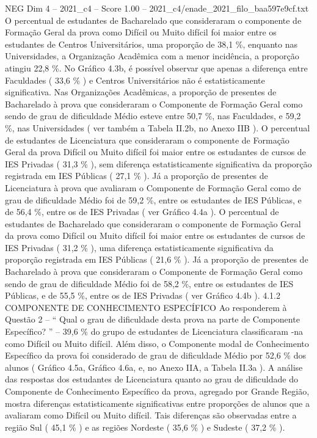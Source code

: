 \begin{textsample}{NEG Dim 4 – 2021\_c4 – Score 1.00 – 2021\_c4/enade\_2021\_filo\_baa597e9cf.txt}
O percentual de estudantes de Bacharelado que consideraram o componente de Formação Geral da prova como Difícil ou Muito difícil foi maior entre os estudantes de Centros Universitários, uma proporção de 38,1 \%, enquanto nas Universidades, a Organização Acadêmica com a menor incidência, a proporção atingiu 22,8 \%.
No Gráfico 4.3b, é possível observar que apenas a diferença entre Faculdades ( 33,6 \% ) e Centros Universitários não é estatisticamente significativa.
Nas Organizações Acadêmicas, a proporção de presentes de Bacharelado à prova que consideraram o Componente de Formação Geral como sendo de grau de dificuldade Médio esteve entre 50,7 \%, nas Faculdades, e 59,2 \%, nas Universidades ( ver também a Tabela II.2b, no Anexo IIB ).
O percentual de estudantes de Licenciatura que consideraram o componente de Formação Geral da prova Difícil ou Muito difícil foi maior entre os estudantes de cursos de IES Privadas ( 31,3 \% ), sem diferença estatisticamente significativa da proporção registrada em IES Públicas ( 27,1 \% ).
Já a proporção de presentes de Licenciatura à prova que avaliaram o Componente de Formação Geral como de grau de dificuldade Médio foi de 59,2 \%, entre os estudantes de IES Públicas, e de 56,4 \%, entre os de IES Privadas ( ver Gráfico 4.4a ).
O percentual de estudantes de Bacharelado que consideraram o componente de Formação Geral da prova como Difícil ou Muito difícil foi maior entre os estudantes de cursos de IES Privadas ( 31,2 \% ), uma diferença estatisticamente significativa da proporção registrada em IES Públicas ( 21,6 \% ).
Já a proporção de presentes de Bacharelado à prova que consideraram o Componente de Formação Geral como sendo de grau de dificuldade Médio foi de 58,2 \%, entre os estudantes de IES Públicas, e de 55,5 \%, entre os de IES Privadas ( ver Gráfico 4.4b ). 4.1.2 COMPONENTE DE CONHECIMENTO ESPECÍFICO Ao responderem à Questão 2 – “ Qual o grau de dificuldade desta prova na parte de Componente Específico? ” – 39,6 \% do grupo de estudantes de Licenciatura classificaram -na como Difícil ou Muito difícil.
Além disso, o Componente modal de Conhecimento Específico da prova foi considerado de grau de dificuldade Médio por 52,6 \% dos alunos ( Gráfico 4.5a, Gráfico 4.6a, e, no Anexo IIA, a Tabela II.3a ).
A análise das respostas dos estudantes de Licenciatura quanto ao grau de dificuldade do Componente de Conhecimento Específico da prova, agregado por Grande Região, mostra diferenças estatisticamente significativas entre proporções de alunos que a avaliaram como Difícil ou Muito difícil.
Tais diferenças são observadas entre a região Sul ( 45,1 \% ) e as regiões Nordeste ( 35,6 \% ) e Sudeste ( 37,2 \% ).

\end{textsample}
